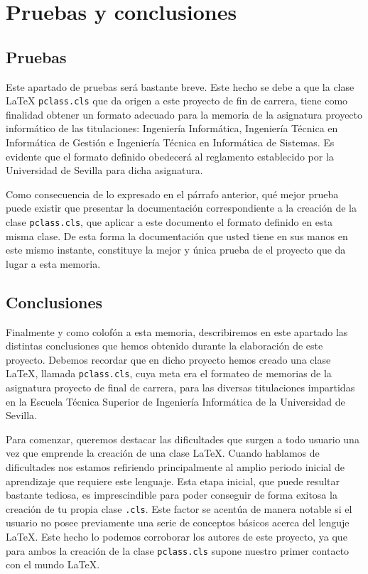 \chapter{Pruebas y conclusiones}\label{pruebas}

\section{Pruebas}
	Este apartado de pruebas ser\'a bastante breve. Este hecho se debe a que la clase \LaTeX{} \texttt{pclass.cls} que 
	da origen a este proyecto de fin de carrera, tiene como finalidad obtener un formato adecuado para la memoria de 
	la asignatura proyecto inform\'atico de las titulaciones: Ingenier\'ia Inform\'atica, Ingenier\'ia T\'ecnica en 
	Inform\'atica de Gesti\'on e Ingenier\'ia T\'ecnica en Inform\'atica de Sistemas. Es evidente que el formato 
	definido obedecer\'a al reglamento establecido por la Universidad de Sevilla para dicha asignatura.
	
	Como consecuencia de lo expresado en el p\'arrafo anterior, qu\'e mejor prueba puede existir que presentar la 
	documentaci\'on correspondiente a la creaci\'on de la clase \texttt{pclass.cls}, que aplicar a este documento
	el formato definido en esta misma clase. De esta forma la documentaci\'on que usted tiene en sus manos en este 
	mismo instante, constituye la mejor y \'unica prueba de el proyecto que da lugar a esta memoria.
	
	
\section{Conclusiones}\label{conclusiones} 

	Finalmente y como colof\'on a esta memoria, describiremos en este apartado las distintas conclusiones que hemos
	obtenido durante la elaboraci\'on de este proyecto. Debemos recordar que en dicho proyecto hemos creado una clase 
	\LaTeX{}, llamada \texttt{pclass.cls}, cuya meta era el formateo de memorias de la asignatura proyecto de final de 
	carrera, para las diversas titulaciones impartidas en la Escuela T\'ecnica Superior de Ingenier\'ia Inform\'atica 
	de la Universidad de Sevilla. 
	
	Para comenzar, queremos destacar las dificultades que surgen a todo usuario una vez que emprende la creaci\'on de 
	una clase \LaTeX{}. Cuando hablamos de dificultades nos estamos refiriendo principalmente al amplio periodo inicial 
	de aprendizaje que requiere este lenguaje. Esta etapa inicial, que puede resultar bastante tediosa, es imprescindible 
	para poder conseguir de forma exitosa la creaci\'on de tu propia clase \texttt{.cls}. Este factor se acent\'ua de 
	manera notable si el usuario no posee previamente una serie de conceptos b\'asicos acerca del lenguje \LaTeX{}. Este 
	hecho lo podemos corroborar los autores de este proyecto, ya que para ambos la creaci\'on de la clase 
	\texttt{pclass.cls} supone nuestro primer contacto con el mundo \LaTeX{}.
	
